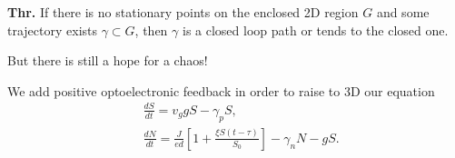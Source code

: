 \textbf{Thr.} If there is no stationary points on the enclosed 2D region $G$ and some trajectory exists $\gamma \subset G$, then $\gamma$ is a closed loop path or tends to the closed one.

\phantom{239}

But there is still a hope for a chaos!

\phantom{239}

We add positive optoelectronic feedback in order to raise to 3D our equation
\begin{align*}
	&\frac{d S}{d t} = v_g g S - \gamma_p S,\\
	&\frac{d N}{d t} = \frac{J}{e d}[1 + \frac{\xi S(t-\tau)}{S_0}] - \gamma_n N - g S.
\end{align*}